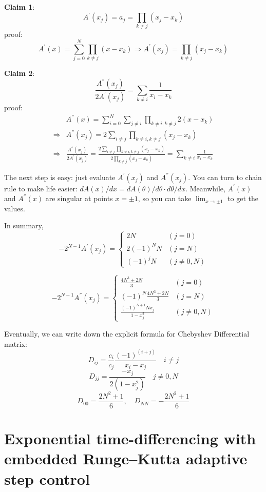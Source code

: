   \textbf{Claim 1}: $$A^{'}(x_{j})=a_{j}=\prod_{k\neq j}(x_{j}-x_{k})$$
  proof: $$A^{'}(x)=\sum_{j=0}^{N}\prod_{k\neq j}(x-x_{k})\Rightarrow
  A^{'}(x_{j})=\prod_{k\neq j}(x_{j}-x_{k}) $$

 \textbf{Claim 2}: $$\frac{A^{''}(x_{j})}{2A^{'}(x_{j})}=\sum_{k\neq i}\frac{1}{x_{i}-x_{k}}$$
 proof:
 \begin{align*}
 & A^{''}(x)=\sum_{i=0}^{N}\sum_{j\neq i}\prod_{k\neq i, k\neq j}2(x-x_{k})\\
 \Rightarrow & A^{''}(x_{j})=2\sum_{i\neq j}\prod_{k\neq i, k\neq j}(x_{j}-x_{k})\\
 \Rightarrow & \frac{A^{''}(x_{j})}{2A^{'}(x_{j})}=
 \frac{2\sum_{i\neq j}\prod_{k\neq i, k\neq j}(x_{j}-x_{k})}{2\prod_{k\neq j}(x_{j}-x_{k})}
 =\sum_{k\neq i}\frac{1}{x_{i}-x_{k}}
  \end{align*}

 The next step is easy: just evaluate $A^{'}(x_j)$ and $A^{''}(x_j)$. You can turn to chain rule
 to make life easier: $dA(x)/dx=dA(\theta)/d\theta \cdot d\theta/dx$. Meanwhile,
 $A^{'}(x)$ and $A^{''}(x)$ are singular at points $x=\pm 1$, so you can take
 $\lim_{x\to \pm 1}$ to get the values.

 In summary,
  \[
   -2^{N-1}A^{'}(x_j)=
   \begin{cases}
    2N & (j=0)\\
    2(-1)^{N}N & (j=N)\\
    (-1)^{j}N & (j\neq 0,N)
   \end{cases}
  \]

  \[
   -2^{N-1}A^{''}(x_j)=
   \begin{cases}
    \frac{4N^3+2N}{3} & (j=0)\\
    (-1)^{N}\frac{4N^3+2N}{3}  & (j=N)\\
    \frac{(-1)^{N+1}Nx_{j}}{1-x_{j}^{2}} & (j\neq 0,N)
   \end{cases}
  \]

  Eventually, we can write down the explicit formula for Chebyshev Differential matrix:
  \[
   D_{ij}=\frac{c_i}{c_j}\frac{(-1)^(i+j)}{x_{i}-x_{j}} \quad i\neq j
  \]
  \[
   D_{jj}=\frac{-x_{j}}{2(1-x^{2}_{j})} \quad j\neq 0,N
  \]
  \[
   D_{00}= \frac{2N^2+1}{6} ,\quad D_{NN}= -\frac{2N^2+1}{6}
  \]


\section{Exponential time-differencing with embedded
          Runge–Kutta adaptive step control}
\label{sect:RKadapt}


